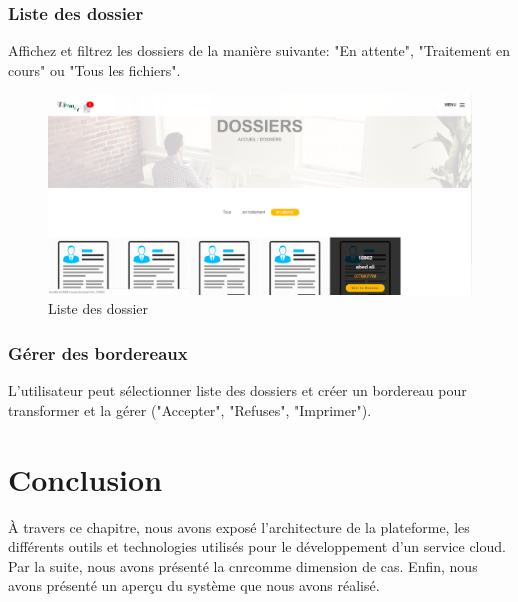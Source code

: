 \subsubsection{ Liste des dossier }
Affichez et filtrez les dossiers de la manière suivante: "En attente", "Traitement en cours" ou "Tous les fichiers".
\begin{figure}[H]
	\centering
	\includegraphics[width=1\linewidth]{images/captures/capturesuser/dossier}
	\caption{Liste des dossier}
	\label{fig:udossier}
\end{figure}


\subsubsection{ Gérer des  bordereaux }
L'utilisateur peut sélectionner liste des dossiers et créer un bordereau pour transformer et la gérer ("Accepter", "Refuses", "Imprimer").

 



\section{Conclusion}

À travers ce chapitre, nous avons exposé l’architecture de la plateforme, les différents outils et technologies utilisés pour le développement d'un service cloud. Par la suite, nous avons présenté la \ac{cnr}comme dimension de cas. Enfin, nous avons présenté un aperçu du système que nous avons réalisé.

